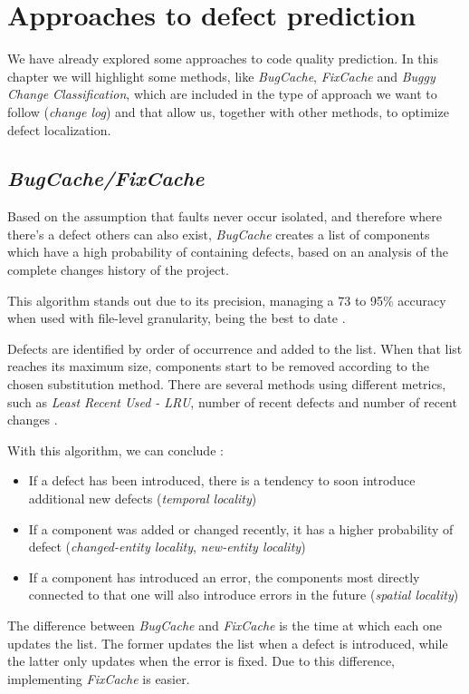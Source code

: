 \section{Approaches to defect prediction}

We have already explored some approaches to code quality prediction. In this chapter we will highlight some methods, like \emph{BugCache}, \emph{FixCache} and \emph{Buggy Change Classification}, which are included in the type of approach we want to follow (\emph{change log}) and that allow us, together with other methods, to optimize defect localization.

\subsection{\emph{BugCache/FixCache}}

Based on the assumption that faults never occur isolated, and therefore where there's a defect others can also exist, \emph{BugCache} creates a list of components which have a high probability of containing defects, based on an analysis of the complete changes history of the project.

This algorithm stands out due to its precision, managing a 73 to 95\% accuracy when used with file-level granularity, being the best to date \cite{Kim2006}.

Defects are identified by order of occurrence and added to the list. When that list reaches its maximum size, components start to be removed according to the chosen substitution method. There are several methods using different metrics, such as \emph{Least Recent Used - LRU}, number of recent defects and number of recent changes \cite{Kim2006}.

With this algorithm, we can conclude \cite{Kim2006}:
%
\begin{itemize}
	\item If a defect has been introduced, there is a tendency to soon introduce additional new defects (\emph{temporal locality})
	\item If a component was added or changed recently, it has a higher probability of defect (\emph{changed-entity locality}, \emph{new-entity locality})
	\item If a component has introduced an error, the components most directly connected to that one will also introduce errors in the future (\emph{spatial locality})
\end{itemize}

The difference between \emph{BugCache} and \emph{FixCache} is the time at which each one updates the list. The former updates the list when a defect is introduced, while the latter only updates when the error is fixed. Due to this difference, implementing \emph{FixCache} is easier.

